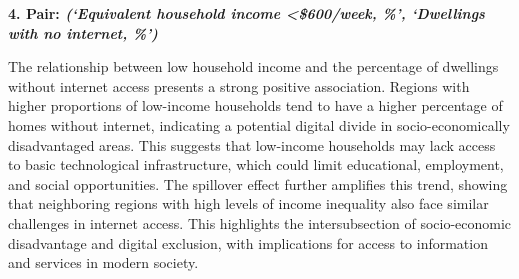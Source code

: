 \documentclass[
	a4paper, %
	10pt, %
	unnumberedsections, %
	twoside, %
]{LTJournalArticle}
\begin{document}
\textbf{4. Pair: \textit{(‘Equivalent household income <\$600/week, \%’, ‘Dwellings with no internet, \%’)}} 

The relationship between low household income and the percentage of dwellings without internet access presents a strong positive association. Regions with higher proportions of low-income households tend to have a higher percentage of homes without internet, indicating a potential digital divide in socio-economically disadvantaged areas. This suggests that low-income households may lack access to basic technological infrastructure, which could limit educational, employment, and social opportunities. The spillover effect further amplifies this trend, showing that neighboring regions with high levels of income inequality also face similar challenges in internet access. This highlights the intersubsection of socio-economic disadvantage and digital exclusion, with implications for access to information and services in modern society.







\printbibliography
\end{document}
